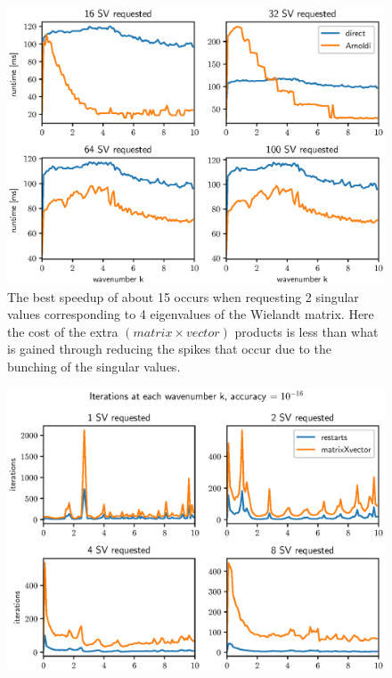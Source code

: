 \documentclass[a4paper, oneside]{thirdparty_stylesheets/discothesis}
\begin{document}
\begin{figure} [H]
	\centering
	\includegraphics[width=0.9\columnwidth]{figures/arnoldi_time_1e-16_2.eps}
	\caption{
		The best speedup of about 15 occurs when requesting 2 singular values corresponding to 4 eigenvalues of the Wielandt matrix. 
		Here the cost of the extra $(matrix\times vector)$ products is less than what is gained through reducing the spikes that occur due to the bunching of the singular values.
	}
	\label{fig:arnoldi_time_1e-16_2}
\end{figure}
\begin{figure} [H]
	\centering
	\includegraphics[width=0.9\columnwidth]{figures/arnoldi_iter_1e-16_1.eps}
	\label{fig:arnoldi_iter_1e-16_1}
\end{figure}
\end{document}

